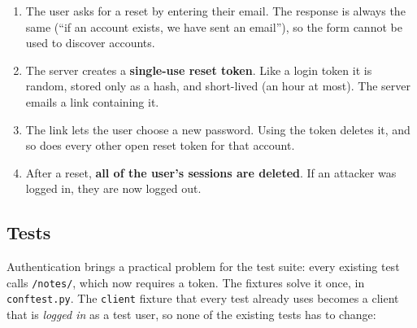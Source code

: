 \begin{enumerate}
\def\labelenumi{\arabic{enumi}.}
\tightlist
\item
  The user asks for a reset by entering their email. The response is always the same (``if an account exists, we have sent an email''), so the form cannot be used to discover accounts.
\item
  The server creates a \textbf{single-use reset token}. Like a login token it is random, stored only as a hash, and short-lived (an hour at most). The server emails a link containing it.
\item
  The link lets the user choose a new password. Using the token deletes it, and so does every other open reset token for that account.
\item
  After a reset, \textbf{all of the user's sessions are deleted}. If an attacker was logged in, they are now logged out.
\end{enumerate}

\subsection*{Tests}\label{38-security:tests}

Authentication brings a practical problem for the test suite: every existing test calls \texttt{/notes/}, which now requires a token. The fixtures solve it once, in \texttt{conftest.py}. The \texttt{client} fixture that every test already uses becomes a client that is \emph{logged in} as a test user, so none of the existing tests has to change:

